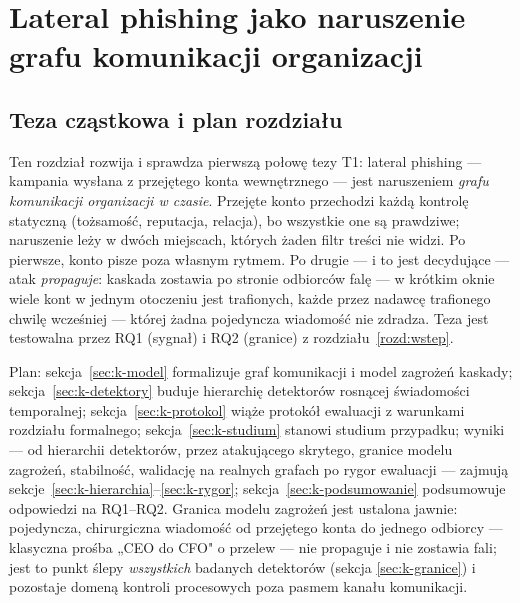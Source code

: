 \chapter{Lateral phishing jako naruszenie grafu komunikacji organizacji}
\label{rozd:kaskada}

\section{Teza cząstkowa i plan rozdziału}
\label{sec:k-teza}

Ten rozdział rozwija i sprawdza pierwszą połowę tezy T1: lateral
phishing --- kampania wysłana z przejętego konta wewnętrznego --- jest
naruszeniem \emph{grafu komunikacji organizacji w czasie}. Przejęte
konto przechodzi każdą kontrolę statyczną (tożsamość, reputacja,
relacja), bo wszystkie one są prawdziwe; naruszenie leży w dwóch
miejscach, których żaden filtr treści nie widzi. Po pierwsze, konto
pisze poza własnym rytmem. Po drugie --- i to jest decydujące ---
atak \emph{propaguje}: kaskada zostawia po stronie odbiorców falę ---
w krótkim oknie wiele kont w jednym otoczeniu jest trafionych, każde
przez nadawcę trafionego chwilę wcześniej --- której żadna pojedyncza
wiadomość nie zdradza. Teza jest testowalna przez RQ1 (sygnał) i RQ2
(granice) z rozdziału~\ref{rozd:wstep}.

Plan: sekcja~\ref{sec:k-model} formalizuje graf komunikacji i model
zagrożeń kaskady; sekcja~\ref{sec:k-detektory} buduje hierarchię
detektorów rosnącej świadomości temporalnej; sekcja~\ref{sec:k-protokol}
wiąże protokół ewaluacji z warunkami rozdziału formalnego;
sekcja~\ref{sec:k-studium} stanowi studium przypadku; wyniki --- od
hierarchii detektorów, przez atakującego skrytego, granice modelu
zagrożeń, stabilność, walidację na realnych grafach po rygor
ewaluacji --- zajmują sekcje~\ref{sec:k-hierarchia}--\ref{sec:k-rygor};
sekcja~\ref{sec:k-podsumowanie} podsumowuje odpowiedzi na RQ1--RQ2.
Granica modelu zagrożeń jest ustalona jawnie: pojedyncza, chirurgiczna
wiadomość od przejętego konta do jednego odbiorcy --- klasyczna prośba
„CEO do CFO" o przelew --- nie propaguje i nie zostawia fali; jest to
punkt ślepy \emph{wszystkich} badanych detektorów (sekcja
\ref{sec:k-granice}) i pozostaje domeną kontroli procesowych poza
pasmem kanału komunikacji.

